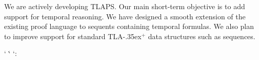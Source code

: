 \documentclass[a4paper,draft]{llncs}
\newcommand{\tlaplus}{\mbox{TLA\kern -.35ex$^+$}\xspace}
\begin{document}
We are actively developing TLAPS. 
Our main short-term objective is to add support for temporal reasoning. 
We have designed a smooth extension of the existing proof language to
sequents containing temporal formulas.  We also plan to improve
support for standard \tlaplus data structures such as sequences.



%
\makeatletter
\newcommand{\realslash}{/}
\begingroup
\catcode`\/\active
\catcode`\.\active
\catcode`:\active
\gdef\urlslash{\@ifnextchar/{\doubleslash}{\discretionary{}{}{}\realslash}}
\gdef\urlend#1{\let/\urlslash\let.\urldot
                 \discretionary{}{}{}#1\discretionary{}{}{}\endgroup}
\endgroup
\newcommand{\urldot}{.\discretionary{}{}{}}
\renewcommand{\url}{\begingroup\urlbegin}
\newcommand{\urlbegin}{%
                       \catcode`\~12\relax
                       \catcode`\#12\relax
                       \catcode`\$12\relax
                       \catcode`\&12\relax
                       \catcode`\_12\relax
                       \catcode`\^12\relax
                       \catcode`\\12\relax
                       \catcode`\/\active
                       \catcode`\.\active
                       \tt
                       \urlend}
\newcommand{\doubleslash}[1]{\discretionary{}{}{}//}

\makeatother 



\end{document}
